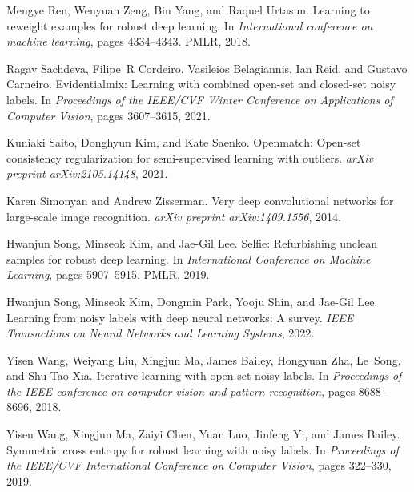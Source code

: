 \documentclass{bmvc2k}
\begin{document}
\begin{thebibliography}{46}
Mengye Ren, Wenyuan Zeng, Bin Yang, and Raquel Urtasun.
\newblock Learning to reweight examples for robust deep learning.
\newblock In \emph{International conference on machine learning}, pages
  4334--4343. PMLR, 2018.

Ragav Sachdeva, Filipe~R Cordeiro, Vasileios Belagiannis, Ian Reid, and Gustavo
  Carneiro.
\newblock Evidentialmix: Learning with combined open-set and closed-set noisy
  labels.
\newblock In \emph{Proceedings of the IEEE/CVF Winter Conference on
  Applications of Computer Vision}, pages 3607--3615, 2021.

Kuniaki Saito, Donghyun Kim, and Kate Saenko.
\newblock Openmatch: Open-set consistency regularization for semi-supervised
  learning with outliers.
\newblock \emph{arXiv preprint arXiv:2105.14148}, 2021.

Karen Simonyan and Andrew Zisserman.
\newblock Very deep convolutional networks for large-scale image recognition.
\newblock \emph{arXiv preprint arXiv:1409.1556}, 2014.

Hwanjun Song, Minseok Kim, and Jae-Gil Lee.
\newblock Selfie: Refurbishing unclean samples for robust deep learning.
\newblock In \emph{International Conference on Machine Learning}, pages
  5907--5915. PMLR, 2019.

Hwanjun Song, Minseok Kim, Dongmin Park, Yooju Shin, and Jae-Gil Lee.
\newblock Learning from noisy labels with deep neural networks: A survey.
\newblock \emph{IEEE Transactions on Neural Networks and Learning Systems},
  2022.

Yisen Wang, Weiyang Liu, Xingjun Ma, James Bailey, Hongyuan Zha, Le~Song, and
  Shu-Tao Xia.
\newblock Iterative learning with open-set noisy labels.
\newblock In \emph{Proceedings of the IEEE conference on computer vision and
  pattern recognition}, pages 8688--8696, 2018.

Yisen Wang, Xingjun Ma, Zaiyi Chen, Yuan Luo, Jinfeng Yi, and James Bailey.
\newblock Symmetric cross entropy for robust learning with noisy labels.
\newblock In \emph{Proceedings of the IEEE/CVF International Conference on
  Computer Vision}, pages 322--330, 2019.


\end{thebibliography}
\end{document}
